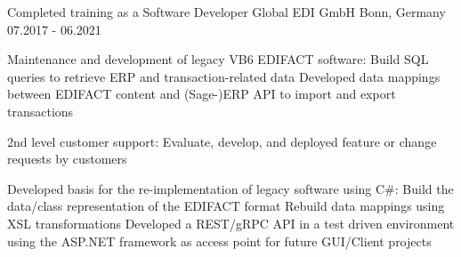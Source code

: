 

\begin{cventries}

  \cventry
    {Completed training as a Software Developer} %
    {Global EDI GmbH} %
    {Bonn, Germany} %
    {07.2017 - 06.2021} %
    { %
        \begin{cvitems}
            \item {Maintenance and development of legacy VB6 EDIFACT software:\newline
                        Build SQL queries to retrieve ERP and transaction-related data\newline
                        Developed data mappings between EDIFACT content and (Sage-)ERP API to import and export transactions}
            \item {2nd level customer support:\newline
                        Evaluate, develop, and deployed feature or change requests by customers}
            \item {Developed basis for the re-implementation of legacy software using C\#:\newline
                        Build the data/class representation of the EDIFACT format\newline
                        Rebuild data mappings using XSL transformations\newline
                        Developed a REST/gRPC API in a test driven environment using the ASP.NET framework as access point for future GUI/Client projects}
        \end{cvitems}
    }

\end{cventries}
